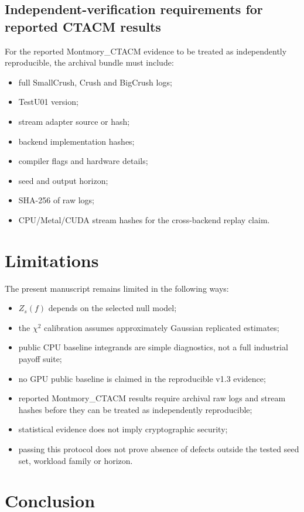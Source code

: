 \documentclass[11pt,a4paper]{article}
\begin{document}
\subsection{Independent-verification requirements for reported CTACM results}

For the reported Montmory\_CTACM evidence to be treated as independently reproducible, the archival bundle must include:
\begin{itemize}
  \item full SmallCrush, Crush and BigCrush logs;
  \item TestU01 version;
  \item stream adapter source or hash;
  \item backend implementation hashes;
  \item compiler flags and hardware details;
  \item seed and output horizon;
  \item SHA-256 of raw logs;
  \item CPU/Metal/CUDA stream hashes for the cross-backend replay claim.
\end{itemize}

\section{Limitations}

The present manuscript remains limited in the following ways:
\begin{itemize}
  \item $Z_s(f)$ depends on the selected null model;
  \item the $\chi^2$ calibration assumes approximately Gaussian replicated estimates;
  \item public CPU baseline integrands are simple diagnostics, not a full industrial payoff suite;
  \item no GPU public baseline is claimed in the reproducible v1.3 evidence;
  \item reported Montmory\_CTACM results require archival raw logs and stream hashes before they can be treated as independently reproducible;
  \item statistical evidence does not imply cryptographic security;
  \item passing this protocol does not prove absence of defects outside the tested seed set, workload family or horizon.
\end{itemize}

\section{Conclusion}
\end{document}
